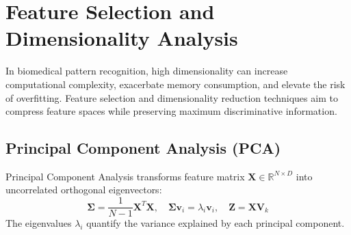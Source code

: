 \documentclass[12pt,a4paper]{article}
\begin{document}
\newpage
\section{Feature Selection and Dimensionality Analysis}\label{sec:selection}

In biomedical pattern recognition, high dimensionality can increase computational complexity, exacerbate memory consumption, and elevate the risk of overfitting. Feature selection and dimensionality reduction techniques aim to compress feature spaces while preserving maximum discriminative information.

\subsection{Principal Component Analysis (PCA)}
Principal Component Analysis transforms feature matrix $\mathbf{X} \in \mathbb{R}^{N \times D}$ into uncorrelated orthogonal eigenvectors:
\begin{equation}
    \mathbf{\Sigma} = \frac{1}{N-1}\mathbf{X}^T\mathbf{X}, \quad \mathbf{\Sigma}\mathbf{v}_i = \lambda_i\mathbf{v}_i, \quad \mathbf{Z} = \mathbf{X}\mathbf{V}_k
\end{equation}
The eigenvalues $\lambda_i$ quantify the variance explained by each principal component.
\end{document}
